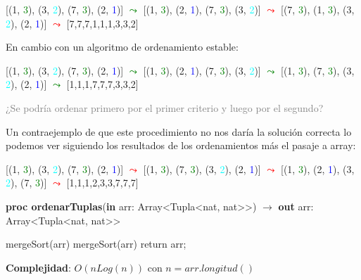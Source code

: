 \documentclass{article}
\newcommand{\curly}{\mathrel{\leadsto}}
\newcommand{\Complexity}[1]{\textbf{Complejidad}: #1}
\newcommand{\meta}[1]{\textcolor{gray}{#1}}
\begin{document}
[(1, \textcolor{green}{3}), (3, \textcolor{cyan}{2}), (7, \textcolor{green}{3}), (2, \textcolor{blue}{1})] \textcolor{green}{$\curly$} [(1, \textcolor{green}{3}), (2, \textcolor{blue}{1}), (7, \textcolor{green}{3}), (3, \textcolor{cyan}{2})] \textcolor{red}{$\curly$} [(7, \textcolor{green}{3}), (1, \textcolor{green}{3}), (3, \textcolor{cyan}{2}), (2, \textcolor{blue}{1})] \textcolor{red}{$\curly$} [7,7,7,1,1,1,3,3,2] \textcolor{red}{}

En cambio con un algoritmo de ordenamiento estable: 

[(1, \textcolor{green}{3}), (3, \textcolor{cyan}{2}), (7, \textcolor{green}{3}), (2, \textcolor{blue}{1})] \textcolor{green}{$\curly$} [(1, \textcolor{green}{3}), (2, \textcolor{blue}{1}), (7, \textcolor{green}{3}), (3, \textcolor{cyan}{2})] \textcolor{green}{$\curly$} [(1, \textcolor{green}{3}), (7, \textcolor{green}{3}), (3, \textcolor{cyan}{2}), (2, \textcolor{blue}{1})] \textcolor{green}{$\curly$} [1,1,1,7,7,7,3,3,2] \textcolor{green}{}

\meta{¿Se podría ordenar primero por el primer criterio y luego por el segundo?}

Un contraejemplo de que este procedimiento no nos daría la solución correcta lo podemos ver siguiendo los resultados de los ordenamientos más el pasaje a array:

[(1, \textcolor{green}{3}), (3, \textcolor{cyan}{2}), (7, \textcolor{green}{3}), (2, \textcolor{blue}{1})] \textcolor{red}{$\curly$} [(1, \textcolor{green}{3}), (7, \textcolor{green}{3}), (3, \textcolor{cyan}{2}), (2, \textcolor{blue}{1})] \textcolor{red}{$\curly$} [(1, \textcolor{green}{3}), (2, \textcolor{blue}{1}), (3, \textcolor{cyan}{2}), (7, \textcolor{green}{3})] \textcolor{red}{$\curly$} [1,1,1,2,3,3,7,7,7] \textcolor{red}{}

\begin{algorithm}[H]
    \caption{
        \textbf{proc ordenarTuplas}(\textbf{in} arr: \textnormal{Array\textless{}Tupla\textless{}nat, nat\textgreater{}\textgreater{}}) $\to$ \textbf{out} arr: \textnormal{Array\textless{}Tupla\textless{}nat, nat\textgreater{}\textgreater{}}
    }
    \begin{algorithmic}[1]
        \State mergeSort(arr) 
        \State mergeSort(arr) 
        \State return arr;
    \end{algorithmic}
    \Complexity{$O(nLog(n)) \text{ con } n = arr.longitud()$}
\end{algorithm}
\end{document}
